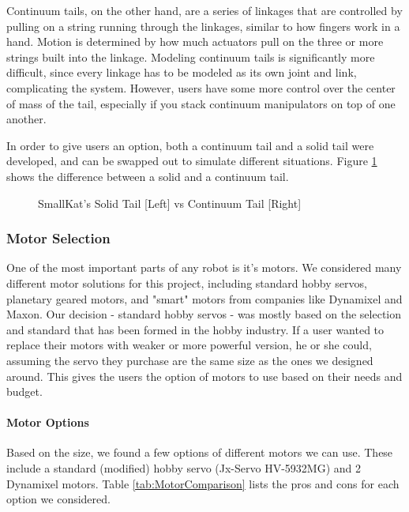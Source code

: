             Continuum tails, on the other hand, are a series of linkages that are controlled by pulling on a string running through the linkages, similar to how fingers work in a hand. Motion is determined by how much actuators pull on the three or more strings built into the linkage. Modeling continuum tails is significantly more difficult, since every linkage has to be modeled as its own joint and link, complicating the system. However, users have some more control over the center of mass of the tail, especially if you stack continuum manipulators on top of one another.

            In order to give users an option, both a continuum tail and a solid tail were developed, and can be swapped out to simulate different situations. Figure \ref{fig:TailComparison} shows the difference between a solid and a continuum tail.
            
            \begin{figure}[H]
                \centering

                \caption{SmallKat's Solid Tail [Left] vs Continuum Tail [Right]}
                \label{fig:TailComparison}
            \end{figure}
                
        \subsubsection{Motor Selection}\label{subsubsec:MotorSelection}
        One of the most important parts of any robot is it's motors. We considered many different motor solutions for this project, including standard hobby servos, planetary geared motors, and "smart" motors from companies like Dynamixel and Maxon. Our decision - standard hobby servos - was mostly based on the selection and standard that has been formed in the hobby industry. If a user wanted to replace their motors with weaker or more powerful version, he or she could, assuming the servo they purchase are the same size as the ones we designed around. This gives the users the option of motors to use based on their needs and budget. 
            \paragraph{Motor Options}
            Based on the size, we found a few options of different motors we can use. These include a standard (modified) hobby servo (Jx-Servo HV-5932MG) and 2 Dynamixel motors. Table \ref{tab:MotorComparison} lists the pros and cons for each option we considered.

